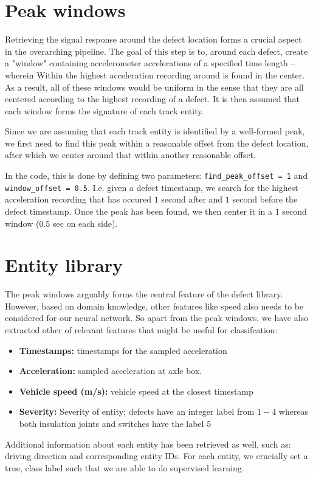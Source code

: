 \section{Peak windows}
Retrieving the signal response around the defect location forms a crucial aspect in the overarching pipeline. The goal of this step is to, around each defect, create a "window" containing accelerometer accelerations of a specified time length -- wherein Within the highest acceleration recording around is found in the center. As a result, all of these windows would be uniform in the sense that they are all centered according to the highest recording of a defect. It is then assumed that each window forms the signature of each track entity. 

Since we are assuming that each track entity is identified by a well-formed peak, we first need to find this peak within a reasonable offset from the defect location, after which we center around that within another reasonable offset. 

In the code, this is done by defining two parameters: \verb|find_peak_offset = 1| and \verb|window_offset = 0.5|. I.e. given a defect timestamp, we search for the highest acceleration recording that has occured $1$ second after and $1$ second before the defect timestamp. Once the peak has been found, we then center it in a $1$ second window ($0.5$ sec on each side). 

\section{Entity library}
The peak windows arguably forms the central feature of the defect library. However, based on domain knowledge, other features like speed also needs to be considered for our neural network. So apart from the peak windows, we have also extracted other of relevant features that might be useful for classifcation:
\begin{itemize}
	\item \textbf{Timestamps:} timestamps for the sampled acceleration
	\item \textbf{Acceleration:} sampled acceleration at axle box.
	\item \textbf{Vehicle speed (m/s):} vehicle speed at the closest timestamp
	\item \textbf{Severity:} Severity of entity; defects have an integer label from $1-4$ whereas both insulation joints and switches have the label $5$
\end{itemize}
Additional information about each entity has been retrieved as well, such as: driving direction and corresponding entity IDs. For each entity, we crucially set a true, class label such that we are able to do supervised learning.

